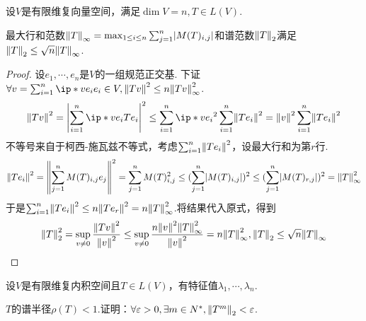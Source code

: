 \begin{lemma}[6.B.16]\label{lem 6.B.16}
    设\(V\)是有限维复向量空间，满足\(\dim V=n,T \in L(V)\).

    最大行和范数\(\norm*{T}_{\infty}=\max_{1 \leq i \leq n} \sum_{j=1}^n \abs*{M(T)_{i,j}}\)和谱范数\(\norm*{T}_2\)满足
    \(\norm*{T}_2 \leq \sqrt{n}\norm*{T}_{\infty}\).
\end{lemma}

\begin{proof}
    设\(e_1,\cdots,e_n\)是\(V\)的一组规范正交基.
    下证\(\forall v=\sum_{i=1}^n \ip*{v}{e_i}e_i \in V,\norm*{Tv}^2 \leq n \norm*{Tv}_{\infty}^2\).
    \begin{align*}
        \norm*{Tv}^2=\abs*{\sum_{i=1}^n \ip*{v}{e_i}Te_i}^2 \leq \sum_{i=1}^n \ip*{v}{e_i}^2 \sum_{i=1}^n \norm*{Te_i}^2 
        =\norm*{v}^2 \sum_{i=1}^n \norm*{Te_i}^2
    \end{align*}
    不等号来自于柯西-施瓦兹不等式，考虑\(\sum_{i=1}^n \norm*{Te_i}^2\)，设最大行和为第\(r\)行.
    \begin{align*}
        \norm*{Te_i}^2=\norm*{\sum_{j=1}^n M(T)_{i,j}e_j}^2=\sum_{j=1}^n M(T)_{i,j}^2
        \leq (\sum_{j=1}^n \abs*{M(T)_{i,j}})^2 \leq (\sum_{j=1}^n \abs*{M(T)_{r,j}})^2=\norm*{T}_{\infty}^2
    \end{align*}
    于是\(\sum_{i=1}^n \norm*{Te_i}^2 \leq n\norm*{Te_r}^2=n\norm*{T}_{\infty}^2\).将结果代入原式，得到
    \begin{align*}
        \norm*{T}_2^2=\sup_{v \ne 0} \dfrac{\norm*{Tv}^2}{\norm*{v}^2} 
        \leq \sup_{v \ne 0} \dfrac{n \norm*{v}^2 \norm*{T}_{\infty}^2}{\norm*{v}^2}=n \norm*{T}_{\infty}^2,
        \norm*{T}_2 \leq \sqrt{n}\norm*{T}_{\infty}
    \end{align*}
\end{proof}

\newpage

\begin{problem}[6.B.16]\label{6.B.16}
    设\(V\)是有限维复内积空间且\(T \in L(V)\)，有特征值\(\lambda_1,\cdots,\lambda_n\).

    \(T\)的谱半径\(\rho(T)<1\).证明：\(\forall \varepsilon>0,\exists m \in N^*,\norm*{T^m}_2<\varepsilon\).    
\end{problem}

